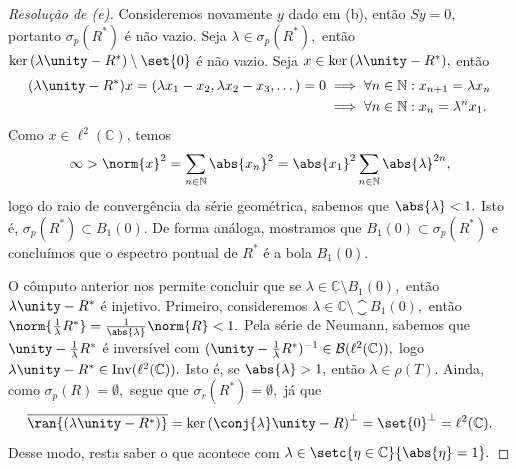 \begin{proof}[Resolução de (e)]
  Consideremos novamente \(y\) dado em (b), então \(Sy = 0,\) portanto \(\sigma_p(R^*)\) é não vazio. Seja \(\lambda \in \sigma_p(R^*),\) então \(\ker{(\lambda \unity - R^*)} \setminus\set{0}\) é não vazio. Seja \(x \in \ker{(\lambda \unity - R^*)},\) então
  \begin{align*}
    (\lambda \unity - R^*)x = (\lambda x_1 - x_2, \lambda x_2 - x_3, \dots) = 0
    &\implies \forall n \in \mathbb{N}: x_{n+1} = \lambda x_n\\
    &\implies \forall n \in \mathbb{N}: x_{n} = \lambda^n x_1.
  \end{align*}
  Como \(x \in \ell^2(\mathbb{C})\), temos
  \begin{equation*}
    \infty > \norm{x}^2 = \sum_{n \in \mathbb{N}}{\abs{x_n}^2} = \abs{x_1}^2 \sum_{n \in \mathbb{N}}{\abs{\lambda}^{2n}},
  \end{equation*}
  logo do raio de convergência da série geométrica, sabemos que \(\abs{\lambda} < 1.\) Isto é, \(\sigma_p(R^*) \subset B_1(0).\) De forma análoga, mostramos que \(B_1(0) \subset \sigma_p(R^*)\) e concluímos que o espectro pontual de \(R^*\) é a bola \(B_1(0).\)

  O cômputo anterior nos permite concluir que se \(\lambda \in \mathbb{C} \setminus B_1(0),\) então \(\lambda \unity - R^*\) é injetivo. Primeiro, consideremos \(\lambda \in \mathbb{C} \setminus \closure{B_1(0)},\) então \(\norm{\frac{1}{\lambda}R^*} = \frac{1}{\abs{\lambda}} \norm{R} < 1.\) Pela série de Neumann, sabemos que \(\unity - \frac{1}{\lambda} R^*\) é inversível com \((\unity - \frac{1}{\lambda} R^*)^{-1} \in \bounded(\ell^2(\mathbb{C})),\) logo \(\lambda \unity - R^* \in \mathrm{Inv}(\ell^2(\mathbb{C})).\) Isto é, se \(\abs{\lambda} > 1,\) então \(\lambda \in \rho(T).\) Ainda, como \(\sigma_p(R) = \emptyset,\) segue que \(\sigma_r(R^*) = \emptyset,\) já que
  \begin{equation*}
    \closure{\ran{(\lambda \unity - R^*)}} = \ker{(\conj{\lambda}\unity - R)}^\perp = \set{0}^\perp = \ell^2(\mathbb{C}).
  \end{equation*}
  Desse modo, resta saber o que acontece com \(\lambda \in \setc{\eta \in \mathbb{C}}{\abs{\eta} = 1}.\)


\end{proof}
